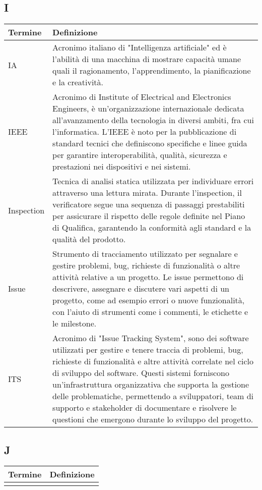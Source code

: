 \documentclass[10pt]{article}
\begin{document}
\subsection{I} %
\begin{longtable}{|>{\centering\arraybackslash}m{2.5cm}|>{\arraybackslash}m{12.5cm}|}
\hline
\rowcolor[gray]{0.8}
\textbf{Termine} & \textbf{Definizione}\\
\endhead
\hline
IA & Acronimo italiano di "Intelligenza artificiale" ed è l'abilità di una macchina di mostrare capacità umane quali il ragionamento, l’apprendimento, la pianificazione e la creatività.\\
\hline
IEEE & Acronimo di Institute of Electrical and Electronics Engineers, è un'organizzazione internazionale dedicata all'avanzamento della tecnologia in diversi ambiti, fra cui l'informatica. L'IEEE è noto per la pubblicazione di standard tecnici che definiscono specifiche e linee guida per garantire interoperabilità, qualità, sicurezza e prestazioni nei dispositivi e nei sistemi.\\
\hline
Inspection & Tecnica di analisi statica utilizzata per individuare errori attraverso una lettura mirata. Durante l'inspection, il verificatore segue una sequenza di passaggi prestabiliti per assicurare il rispetto delle regole definite nel Piano di Qualifica, garantendo la conformità agli standard e la qualità del prodotto.\\
\hline
Issue & Strumento di tracciamento utilizzato per segnalare e gestire problemi, bug, richieste di funzionalità o altre attività relative a un progetto. Le issue permettono di descrivere, assegnare e discutere vari aspetti di un progetto, come ad esempio errori o nuove funzionalità, con l'aiuto di strumenti come i commenti, le etichette e le milestone.\\
\hline
ITS & Acronimo di "Issue Tracking System", sono dei software utilizzati per gestire e tenere traccia di problemi, bug, richieste di funzionalità e altre attività correlate nel ciclo di sviluppo del software. Questi sistemi forniscono un'infrastruttura organizzativa che supporta la gestione delle problematiche, permettendo a sviluppatori, team di supporto e stakeholder di documentare e risolvere le questioni che emergono durante lo sviluppo del progetto.\\
\hline
\end{longtable}

\subsection{J} %
\begin{longtable}{|>{\centering\arraybackslash}m{2.5cm}|>{\arraybackslash}m{12.5cm}|}
\hline
\rowcolor[gray]{0.8}
\textbf{Termine} & \textbf{Definizione}\\
\endhead
\hline
 & \\
\hline
\end{longtable}
\end{document}
